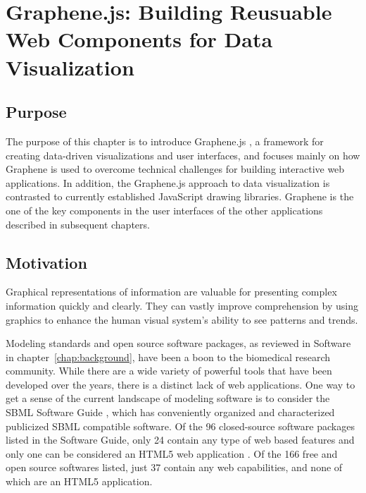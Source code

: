 \chapter{Graphene.js: Building Reusuable Web Components for Data Visualization}
\label{chap:graphene}

\section{Purpose}

The purpose of this chapter is to introduce Graphene.js \autocite{gu2014graphene}, a framework for creating data-driven visualizations and user interfaces, and focuses mainly on how Graphene is used to overcome technical challenges for building interactive web applications.
In addition, the Graphene.js approach to data visualization is contrasted to currently established JavaScript drawing libraries.
Graphene is the one of the key components in the user interfaces of the other applications described in subsequent chapters.

\section{Motivation}

Graphical representations of information are valuable for presenting complex information quickly and clearly. \autocite{newsom2007public, smiciklas2012power, tufte1983visual}
They can vastly improve comprehension by using graphics to enhance the human visual system’s ability to see patterns and trends. \autocite{heer2010tour, sears2007human}

Modeling standards and open source software packages, as reviewed in  Software in chapter~\ref{chap:background}, have been a boon to the biomedical research community.
While there are a wide variety of powerful tools that have been developed over the years, there is a distinct lack of web applications.
One way to get a sense of the current landscape of modeling software is to consider the SBML Software Guide \autocite{sbml2014software}, which has conveniently organized and characterized publicized SBML compatible software.
Of the 96 closed-source software packages listed in the Software Guide, only 24 contain any type of web based features and only one can be considered an HTML5 web application \autocite{olivier2004web}.
Of the 166 free and open source softwares listed, just 37 contain any web capabilities, and none of which are an HTML5 application.
